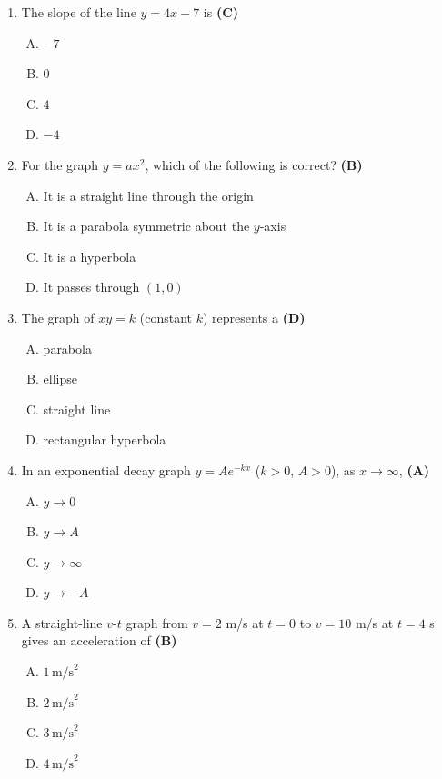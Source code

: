 \documentclass[10pt,a4paper]{article}
\begin{document}
\begin{enumerate}[1.]

\item The slope of the line $y = 4x - 7$ is \hfill \textbf{(C)}
\begin{enumerate}[(A)]
    \item $-7$
    \item $0$
    \item $4$
    \item $-4$
\end{enumerate}

\item For the graph $y = ax^2$, which of the following is correct? \hfill \textbf{(B)}
\begin{enumerate}[(A)]
    \item It is a straight line through the origin
    \item It is a parabola symmetric about the $y$-axis
    \item It is a hyperbola
    \item It passes through $(1, 0)$
\end{enumerate}

\item The graph of $xy = k$ (constant $k$) represents a \hfill \textbf{(D)}
\begin{enumerate}[(A)]
    \item parabola
    \item ellipse
    \item straight line
    \item rectangular hyperbola
\end{enumerate}

\item In an exponential decay graph $y = Ae^{-kx}$ ($k > 0$, $A > 0$), as $x \to \infty$, \hfill \textbf{(A)}
\begin{enumerate}[(A)]
    \item $y \to 0$
    \item $y \to A$
    \item $y \to \infty$
    \item $y \to -A$
\end{enumerate}

\item A straight-line $v$-$t$ graph from $v = 2$ m/s at $t=0$ to $v=10$ m/s at $t=4$ s gives an acceleration of \hfill \textbf{(B)}
\begin{enumerate}[(A)]
    \item $1\,\text{m/s}^2$
    \item $2\,\text{m/s}^2$
    \item $3\,\text{m/s}^2$
    \item $4\,\text{m/s}^2$
\end{enumerate}


\end{enumerate}
\end{document}
